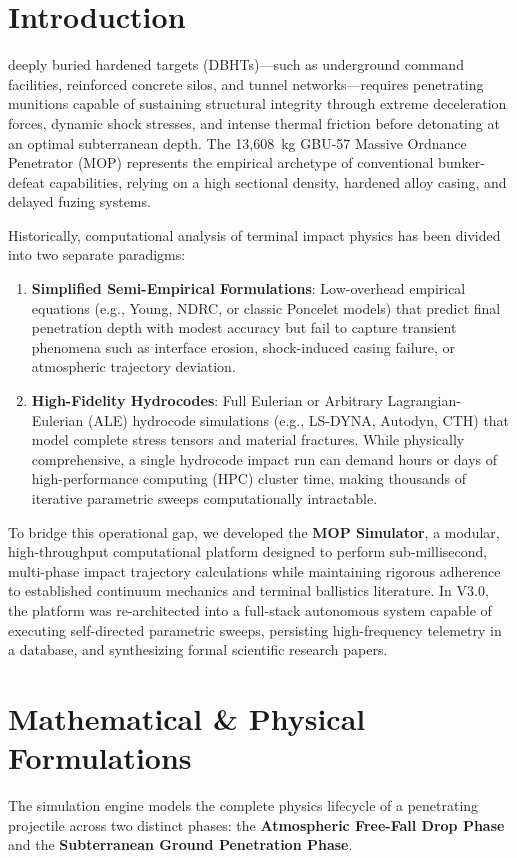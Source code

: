 \documentclass[journal,10pt,twocolumn]{IEEEtran}
\begin{document}
\section{Introduction}
 deeply buried hardened targets (DBHTs)---such as underground command facilities, reinforced concrete silos, and tunnel networks---requires penetrating munitions capable of sustaining structural integrity through extreme deceleration forces, dynamic shock stresses, and intense thermal friction before detonating at an optimal subterranean depth. The 13,608~kg GBU-57 Massive Ordnance Penetrator (MOP) represents the empirical archetype of conventional bunker-defeat capabilities, relying on a high sectional density, hardened alloy casing, and delayed fuzing systems.

Historically, computational analysis of terminal impact physics has been divided into two separate paradigms:
\begin{enumerate}
    \item \textbf{Simplified Semi-Empirical Formulations}: Low-overhead empirical equations (e.g., Young, NDRC, or classic Poncelet models) that predict final penetration depth with modest accuracy but fail to capture transient phenomena such as interface erosion, shock-induced casing failure, or atmospheric trajectory deviation.
    \item \textbf{High-Fidelity Hydrocodes}: Full Eulerian or Arbitrary Lagrangian-Eulerian (ALE) hydrocode simulations (e.g., LS-DYNA, Autodyn, CTH) that model complete stress tensors and material fractures. While physically comprehensive, a single hydrocode impact run can demand hours or days of high-performance computing (HPC) cluster time, making thousands of iterative parametric sweeps computationally intractable.
\end{enumerate}

To bridge this operational gap, we developed the \textbf{MOP Simulator}, a modular, high-throughput computational platform designed to perform sub-millisecond, multi-phase impact trajectory calculations while maintaining rigorous adherence to established continuum mechanics and terminal ballistics literature. In V3.0, the platform was re-architected into a full-stack autonomous system capable of executing self-directed parametric sweeps, persisting high-frequency telemetry in a database, and synthesizing formal scientific research papers.

\section{Mathematical \& Physical Formulations}
The simulation engine models the complete physics lifecycle of a penetrating projectile across two distinct phases: the \textbf{Atmospheric Free-Fall Drop Phase} and the \textbf{Subterranean Ground Penetration Phase}.
\end{document}
